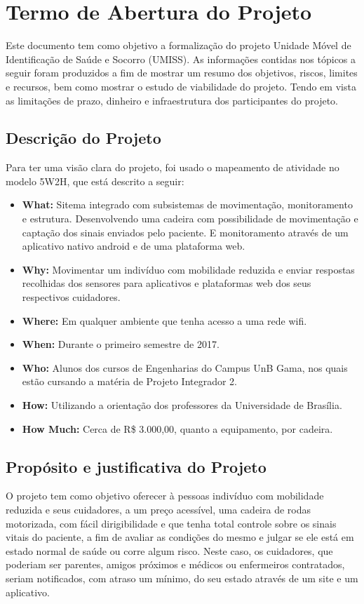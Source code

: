 \section{Termo de Abertura do Projeto}
Este documento tem como objetivo a formalização do projeto Unidade Móvel de
Identificação de Saúde e Socorro (UMISS). As informações contidas nos tópicos 
a seguir foram produzidos a fim de mostrar um resumo dos objetivos, riscos, 
limites e recursos, bem como mostrar o estudo de viabilidade do projeto. 
Tendo em vista as limitações de prazo, dinheiro e infraestrutura dos 
participantes do projeto.
\subsection{Descrição do Projeto}
Para ter uma visão clara do projeto, foi usado o mapeamento de atividade no 
modelo 5W2H, que está descrito a seguir:

\begin{itemize}
    \item \textbf{What:} Sitema integrado com subsistemas de movimentação,
    monitoramento e estrutura. Desenvolvendo uma cadeira com possibilidade
    de movimentação e captação dos sinais enviados pelo paciente. E monitoramento
    através de um aplicativo nativo android e de uma plataforma web.
    \item \textbf{Why:} Movimentar um indivíduo com mobilidade reduzida
    e enviar respostas recolhidas
    dos sensores para aplicativos e plataformas web dos seus respectivos
    cuidadores.
    \item \textbf{Where:} Em qualquer ambiente que tenha acesso a uma rede wifi.
    \item \textbf{When:} Durante o primeiro semestre de 2017.
    \item \textbf{Who:} Alunos dos cursos de Engenharias do Campus UnB Gama, nos
    quais estão cursando a matéria de Projeto Integrador 2.
    \item \textbf{How:} Utilizando a orientação dos professores da Universidade
    de Brasília.
    \item \textbf{How Much:} Cerca de R\$ 3.000,00, quanto a equipamento, por
    cadeira.
\end{itemize}

\subsection{Propósito e justificativa do Projeto}
O projeto tem como objetivo oferecer à pessoas indivíduo com mobilidade reduzida
e seus cuidadores,
a um preço acessível, uma cadeira de rodas motorizada, com fácil dirigibilidade 
e que tenha total controle sobre os sinais vitais do paciente, a fim de avaliar 
as condições do mesmo e julgar se ele está em estado normal de saúde ou corre 
algum risco. Neste caso, os cuidadores, que poderiam ser parentes, amigos 
próximos e médicos ou enfermeiros contratados, seriam notificados, com atraso 
um mínimo, do seu estado através de um site e um aplicativo.

